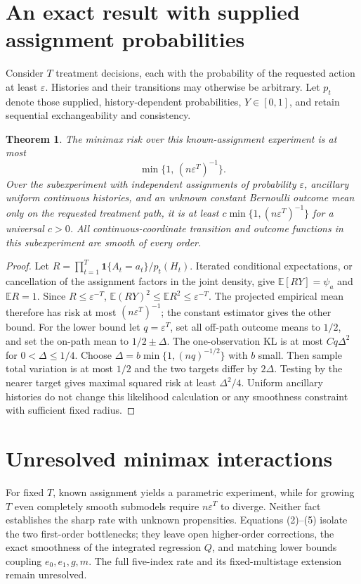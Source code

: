 \documentclass[11pt]{article}
\newtheorem{theorem}{Theorem}
\theoremstyle{definition}
\begin{document}
\section*{An exact result with supplied assignment probabilities}
Consider $T$ treatment decisions, each with the probability of the requested
action at least $\varepsilon$. Histories and their transitions may otherwise
be arbitrary. Let $p_t$ denote those supplied, history-dependent probabilities,
$Y\in[0,1]$, and retain sequential exchangeability and consistency.
\begin{theorem}
The minimax risk over this known-assignment experiment is at most
\[
 \min\{1,\,(n\varepsilon^T)^{-1}\}.
\]
Over the subexperiment with independent assignments of probability
$\varepsilon$, ancillary uniform continuous histories, and an unknown
constant Bernoulli outcome mean only on the requested treatment path,
it is at least
$c\min\{1,(n\varepsilon^T)^{-1}\}$ for a universal $c>0$.
All continuous-coordinate transition and outcome functions in this
subexperiment are smooth of every order.
\end{theorem}
\begin{proof}
Let $R=\prod_{t=1}^T\mathbf1\{A_t=a_t\}/p_t(H_t)$.
Iterated conditional expectations, or cancellation of the assignment
factors in the joint density, give $\mathbb E[RY]=\psi_a$ and
$\mathbb E R=1$. Since $R\le\varepsilon^{-T}$,
$\mathbb E(RY)^2\le\mathbb E R^2\le\varepsilon^{-T}$.
The projected empirical mean therefore has risk at most
$(n\varepsilon^T)^{-1}$; the constant estimator gives the other bound.
For the lower bound let $q=\varepsilon^T$, set all off-path outcome means
to $1/2$, and set the on-path mean to $1/2\pm\Delta$.
The one-observation KL is at most $Cq\Delta^2$ for
$0<\Delta\le1/4$. Choose
$\Delta=b\min\{1,(nq)^{-1/2}\}$ with $b$ small. Then sample total
variation is at most $1/2$ and the two targets differ by $2\Delta$.
Testing by the nearer target gives maximal squared risk at least
$\Delta^2/4$. Uniform ancillary histories do not change this likelihood
calculation or any smoothness constraint with sufficient fixed radius.
\end{proof}

\section*{Unresolved minimax interactions}
For fixed $T$, known assignment yields a parametric experiment, while for
growing $T$ even completely smooth submodels require $n\varepsilon^T$
to diverge. Neither fact establishes the sharp rate with unknown
propensities. Equations (2)--(5) isolate the two first-order bottlenecks;
they leave open higher-order corrections, the exact smoothness of the
integrated regression $Q$, and matching lower bounds coupling $e_0,e_1,g,m$.
The full five-index rate and its fixed-multistage extension remain unresolved.
\end{document}
